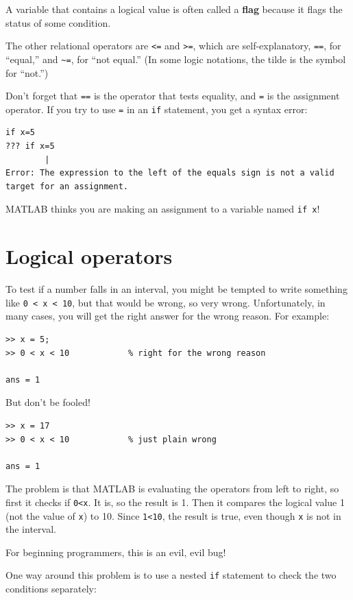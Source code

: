 \documentclass{book}
\begin{document}
A variable that contains a logical value is often called a {\bf flag}
because it flags the status of some condition.

The other relational operators are {\tt <=} and {\tt >=}, which are
self-explanatory, {\tt ==}, for ``equal,'' and 
\verb+~=+, for ``not equal.''  (In some logic notations, the tilde
is the symbol for ``not.'')

Don't forget that {\tt ==} is the operator that tests equality,
and {\tt =} is the assignment operator.  If you try to use {\tt =} in
an {\tt if} statement, you get a syntax error:

\begin{verbatim}
if x=5
??? if x=5
        |
Error: The expression to the left of the equals sign is not a valid 
target for an assignment.
\end{verbatim}

MATLAB thinks you are making an assignment to a variable named {\tt if x}! 


\section{Logical operators}
\label{logop}

To test if a number falls in an interval, you might be
tempted to write something like {\tt 0 < x < 10}, but that
would be wrong, so very wrong.  Unfortunately, in many cases,
you will get the right answer for the wrong reason.  For
example:

\begin{verbatim}
>> x = 5;
>> 0 < x < 10            % right for the wrong reason

ans = 1
\end{verbatim}

But don't be fooled!

\begin{verbatim}
>> x = 17
>> 0 < x < 10            % just plain wrong

ans = 1
\end{verbatim}

The problem is that MATLAB is evaluating the operators from left
to right, so first it checks if {\tt 0<x}.  It is, so the result
is 1.  Then it compares the logical value 1 (not the value of
{\tt x}) to 10.  Since {\tt 1<10}, the result is true, even though
{\tt x} is not in the interval.

For beginning programmers, this is an evil, evil bug!

One way around this problem is to use a nested {\tt if} statement to
check the two conditions separately:
\end{document}
